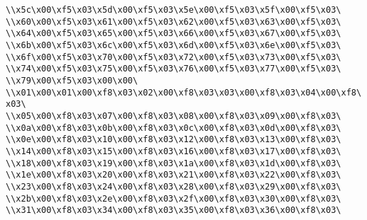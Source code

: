\verb|\\x5c\x00\xf5\x03\x5d\x00\xf5\x03\x5e\x00\xf5\x03\x5f\x00\xf5\x03\|\newline
\verb|\\x60\x00\xf5\x03\x61\x00\xf5\x03\x62\x00\xf5\x03\x63\x00\xf5\x03\|\newline
\verb|\\x64\x00\xf5\x03\x65\x00\xf5\x03\x66\x00\xf5\x03\x67\x00\xf5\x03\|\newline
\verb|\\x6b\x00\xf5\x03\x6c\x00\xf5\x03\x6d\x00\xf5\x03\x6e\x00\xf5\x03\|\newline
\verb|\\x6f\x00\xf5\x03\x70\x00\xf5\x03\x72\x00\xf5\x03\x73\x00\xf5\x03\|\newline
\verb|\\x74\x00\xf5\x03\x75\x00\xf5\x03\x76\x00\xf5\x03\x77\x00\xf5\x03\|\newline
\verb|\\x79\x00\xf5\x03\x00\x00\|\newline
\verb|\\x01\x00\x01\x00\xf8\x03\x02\x00\xf8\x03\x03\x00\xf8\x03\x04\x00\xf8\x03\|\newline
\verb|\\x05\x00\xf8\x03\x07\x00\xf8\x03\x08\x00\xf8\x03\x09\x00\xf8\x03\|\newline
\verb|\\x0a\x00\xf8\x03\x0b\x00\xf8\x03\x0c\x00\xf8\x03\x0d\x00\xf8\x03\|\newline
\verb|\\x0e\x00\xf8\x03\x10\x00\xf8\x03\x12\x00\xf8\x03\x13\x00\xf8\x03\|\newline
\verb|\\x14\x00\xf8\x03\x15\x00\xf8\x03\x16\x00\xf8\x03\x17\x00\xf8\x03\|\newline
\verb|\\x18\x00\xf8\x03\x19\x00\xf8\x03\x1a\x00\xf8\x03\x1d\x00\xf8\x03\|\newline
\verb|\\x1e\x00\xf8\x03\x20\x00\xf8\x03\x21\x00\xf8\x03\x22\x00\xf8\x03\|\newline
\verb|\\x23\x00\xf8\x03\x24\x00\xf8\x03\x28\x00\xf8\x03\x29\x00\xf8\x03\|\newline
\verb|\\x2b\x00\xf8\x03\x2e\x00\xf8\x03\x2f\x00\xf8\x03\x30\x00\xf8\x03\|\newline
\verb|\\x31\x00\xf8\x03\x34\x00\xf8\x03\x35\x00\xf8\x03\x36\x00\xf8\x03\|\newline
